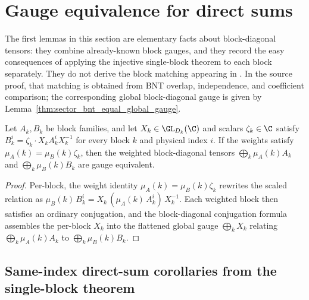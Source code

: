 \section{Gauge equivalence for direct sums}%
\label{sec:multi_block_ft}

The first lemmas in this section are elementary facts about block-diagonal tensors:
they combine already-known block gauges, and they record the easy consequences
of applying the injective single-block theorem to each block separately. They do
not derive the block matching appearing in
\cite[Theorem~2.10]{Cirac2016MPDO_arXiv}. In the source proof, that matching
is obtained from BNT overlap, independence, and coefficient comparison; the
corresponding global block-diagonal gauge is given by
Lemma~\ref{thm:sector_bnt_equal_global_gauge}.

\begin{lemma}%
    \label{lem:gauge_equiv_block_gauge_phase_weight}
    \leanok
    Let $A_k, B_k$ be block families, and let $X_k \in \GL_{D_k}(\C)$
    and scalars $\zeta_k \in \C$ satisfy
    $B_k^i = \zeta_k \cdot X_k A_k^i X_k^{-1}$ for every block $k$ and
    physical index $i$. If the weights satisfy $\mu_A(k) = \mu_B(k) \zeta_k$,
    then the weighted block-diagonal tensors
    $\bigoplus_k \mu_A(k) A_k$ and $\bigoplus_k \mu_B(k) B_k$ are gauge
    equivalent.
\end{lemma}

\begin{proof}\leanok
    Per-block, the weight identity $\mu_A(k) = \mu_B(k) \zeta_k$ rewrites the
    scaled relation as
    $\mu_B(k)\,B_k^i = X_k\,(\mu_A(k)\,A_k^i)\,X_k^{-1}$.
    Each weighted block then satisfies an ordinary conjugation, and the
    block-diagonal conjugation formula assembles the per-block $X_k$ into the
    flattened global gauge $\bigoplus_k X_k$ relating
    $\bigoplus_k \mu_A(k) A_k$ to $\bigoplus_k \mu_B(k) B_k$.
\end{proof}

\subsection{Same-index direct-sum corollaries from the single-block theorem}%
\label{subsec:ft_block_sum_corollaries}

